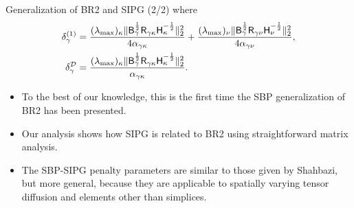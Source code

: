 \documentclass{beamer}
\begin{document}
\begin{frame}{Generalization of BR2 and SIPG (2/2)}
    where 
    \footnotesize
    \begin{align*}
    \delta_{\gamma}^{(1)} &= \frac{(\lambda_{\max})_\kappa 
        \| \Bg^{\frac{1}{2}} \Rgk \Hk^{-\frac{1}{2}} \|_{2}^{2}}%
    {4 \alpha_{\gamma\kappa}} 
    + \frac{(\lambda_{\max})_\nu 
        \| \Bg^{\frac{1}{2}} \Rgn \H_{\nu}^{-\frac{1}{2}} \|_{2}^{2}}%
    {4 \alpha_{\gamma\nu}}, \\ 
    \delta_{\gamma}^\fnc{D} &= \frac{(\lambda_{\max})_\kappa 
        \| \Bg^{\frac{1}{2}} \Rgk \Hk^{-\frac{1}{2}} \|_{2}^{2}}%
    {\alpha_{\gamma\kappa}}.
    \normalsize
    \end{align*}
    \normalsize
    \begin{itemize}
        \item To the best of our knowledge, this is the first time the SBP generalization of BR2 has been presented.
        \item Our analysis shows how SIPG is related to BR2 using straightforward matrix analysis.
        \item The SBP-SIPG penalty parameters are similar to those given by Shahbazi\cite{Shahbazi2005explicit}, but more general, because they are applicable to spatially varying tensor diffusion and elements other than simplices.
    \end{itemize}
    
\end{frame}
\end{document}
